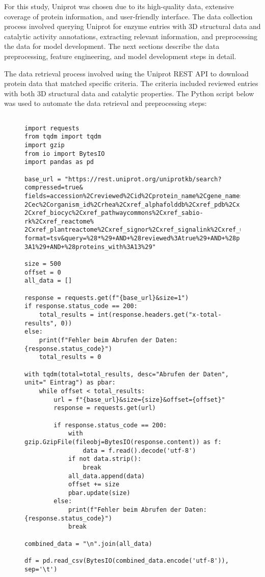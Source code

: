 For this study, Uniprot was chosen due to its high-quality data, extensive coverage of protein information, and user-friendly interface. The data collection process involved querying Uniprot for enzyme entries with 3D structural data and catalytic activity annotations, extracting relevant information, and preprocessing the data for model development. The next sections describe the data preprocessing, feature engineering, and model development steps in detail.

The data retrieval process involved using the Uniprot REST API to download protein data that matched specific criteria. The criteria included reviewed entries with both 3D structural data and catalytic properties. The Python script below was used to automate the data retrieval and preprocessing steps:  \autocite{polleyTobiasPolDeepZyme2024}

\begin{figure}[bht]
\begin{lstlisting}[caption=Python script for data retrieval and preprocessing from Uniprot, label=lst:uniprot_data_retrieval]

import requests
from tqdm import tqdm
import gzip
from io import BytesIO
import pandas as pd

base_url = "https://rest.uniprot.org/uniprotkb/search?compressed=true&
fields=accession%2Creviewed%2Cid%2Cprotein_name%2Cgene_names%2Corganism_name%
2Cec%2Corganism_id%2Crhea%2Cxref_alphafolddb%2Cxref_pdb%2Cxref_brenda%
2Cxref_biocyc%2Cxref_pathwaycommons%2Cxref_sabio-rk%2Cxref_reactome%
2Cxref_plantreactome%2Cxref_signor%2Cxref_signalink%2Cxref_unipathway&
format=tsv&query=%28*%29+AND+%28reviewed%3Atrue%29+AND+%28proteins_with%
3A1%29+AND+%28proteins_with%3A13%29"

size = 500
offset = 0
all_data = []

response = requests.get(f"{base_url}&size=1")
if response.status_code == 200:
    total_results = int(response.headers.get("x-total-results", 0))
else:
    print(f"Fehler beim Abrufen der Daten: {response.status_code}")
    total_results = 0

with tqdm(total=total_results, desc="Abrufen der Daten", unit=" Eintrag") as pbar:
    while offset < total_results:
        url = f"{base_url}&size={size}&offset={offset}"
        response = requests.get(url)
        
        if response.status_code == 200:
            with gzip.GzipFile(fileobj=BytesIO(response.content)) as f:
                data = f.read().decode('utf-8')
            if not data.strip():
                break
            all_data.append(data)
            offset += size
            pbar.update(size)
        else:
            print(f"Fehler beim Abrufen der Daten: {response.status_code}")
            break

combined_data = "\n".join(all_data)

df = pd.read_csv(BytesIO(combined_data.encode('utf-8')), sep='\t')

\end{lstlisting}
\end{figure}


